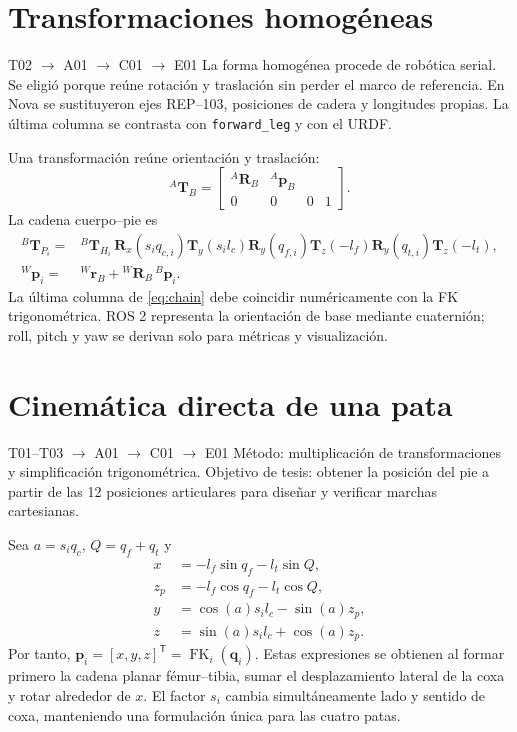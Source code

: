 \documentclass[11pt,letterpaper]{article}
\newcommand{\vect}[1]{\bm{#1}}
\newcommand{\mat}[1]{\bm{#1}}
\newcommand{\trans}{^{\mathsf T}}
\newcommand{\FK}{\operatorname{FK}}
\begin{document}
\section{Transformaciones homogéneas}
\begin{tracebox}{T02 $\rightarrow$ A01 $\rightarrow$ C01 $\rightarrow$ E01}
La forma homogénea procede de robótica serial. Se eligió porque reúne rotación y
traslación sin perder el marco de referencia. En Nova se sustituyeron ejes REP--103,
posiciones de cadera y longitudes propias. La última columna se contrasta con
\texttt{forward\_leg} y con el URDF.
\end{tracebox}
Una transformación reúne orientación y traslación:
\begin{equation}
 {}^A\mat T_B=\begin{bmatrix}{}^A\mat R_B&{}^A\vect p_B\\
 0&0&0&1\end{bmatrix}. \label{eq:homogeneous}
\end{equation}
La cadena cuerpo--pie es
\begin{align}
 {}^B\mat T_{P_i}={}&{}^B\mat T_{H_i}\,
 \mat R_x(s_iq_{c,i})\mat T_y(s_il_c)\mat R_y(q_{f,i})
 \mat T_z(-l_f)\mat R_y(q_{t,i})\mat T_z(-l_t),\label{eq:chain}\\
 {}^W\vect p_i={}&{}^W\vect r_B+{}^W\mat R_B\,{}^B\vect p_i.\label{eq:worldfoot}
\end{align}
La última columna de \cref{eq:chain} debe coincidir numéricamente con la FK
trigonométrica. ROS 2 representa la orientación de base mediante cuaternión;
roll, pitch y yaw se derivan solo para métricas y visualización.

\section{Cinemática directa de una pata}
\begin{tracebox}{T01--T03 $\rightarrow$ A01 $\rightarrow$ C01 $\rightarrow$ E01}
Método: multiplicación de transformaciones y simplificación trigonométrica.
Objetivo de tesis: obtener la posición del pie a partir de las 12 posiciones
articulares para diseñar y verificar marchas cartesianas.
\end{tracebox}
Sea $a=s_iq_c$, $Q=q_f+q_t$ y
\begin{align}
 x &= -l_f\sin q_f-l_t\sin Q,\label{eq:fkx}\\
 z_p &= -l_f\cos q_f-l_t\cos Q,\label{eq:fkzp}\\
 y &= \cos(a)s_il_c-\sin(a)z_p,\label{eq:fky}\\
 z &= \sin(a)s_il_c+\cos(a)z_p.\label{eq:fkz}
\end{align}
Por tanto, $\vect p_i=[x,y,z]\trans=\FK_i(\vect q_i)$. Estas expresiones se
obtienen al formar primero la cadena planar fémur--tibia, sumar el
desplazamiento lateral de la coxa y rotar alrededor de $x$. El factor $s_i$
cambia simultáneamente lado y sentido de coxa, manteniendo una formulación
única para las cuatro patas.
\end{document}
